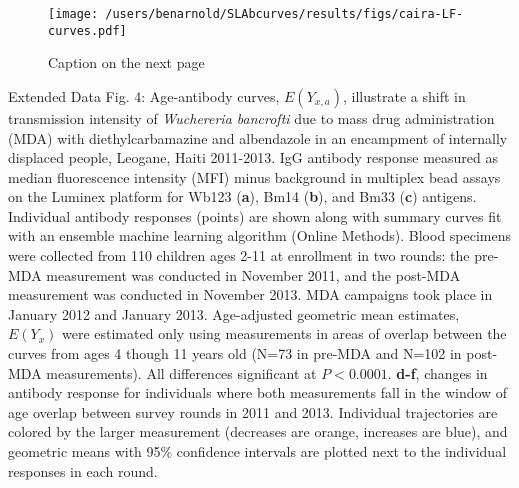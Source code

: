 \documentclass[11pt]{article}
\begin{document}
\clearpage
\begin{figure}[htbp]
\begin{center}
\texttt{[image: /users/benarnold/SLAbcurves/results/figs/caira-LF-curves.pdf]}
\begin{minipage}{\textwidth}
\caption{Caption on the next page}
\label{fig:cairaS5}
\end{minipage}
\end{center}
\end{figure}

\clearpage
Extended Data Fig. 4: Age-antibody curves, $E(Y_{x,a})$, illustrate a shift in transmission intensity of \textit{Wuchereria bancrofti} due to mass drug administration (MDA) with diethylcarbamazine and albendazole in an encampment of internally displaced people, Leogane, Haiti 2011-2013.  IgG antibody response measured as median fluorescence intensity (MFI) minus background in multiplex bead assays on the Luminex platform for Wb123 (\textbf{a}), Bm14 (\textbf{b}), and Bm33 (\textbf{c}) antigens. Individual antibody responses (points) are shown along with summary curves fit with an ensemble machine learning algorithm (Online Methods). Blood specimens were collected from 110 children ages 2-11 at enrollment in two rounds: the pre-MDA measurement was conducted in November 2011, and the post-MDA measurement was conducted in November 2013.  MDA campaigns took place in January 2012 and January 2013. Age-adjusted geometric mean estimates, $E(Y_x)$ were estimated only using measurements in areas of overlap between the curves from ages 4 though 11 years old (N=73 in pre-MDA and N=102 in post-MDA measurements). All differences significant at $P<0.0001$. \textbf{d-f}, changes in antibody response for individuals where both measurements fall in the window of age overlap between survey rounds in 2011 and 2013. Individual trajectories are colored by the larger measurement (decreases are orange, increases are blue), and geometric means with 95\% confidence intervals are plotted next to the individual responses in each round.
\end{document}
